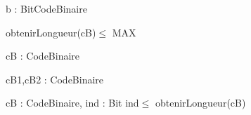 \begin{algorithme}

    {b : Bit}{CodeBinaire}{}

    {
    }
    {obtenirLongueur(cB)$\le$ MAX}

    {cB : CodeBinaire}{\naturelNonNul}{}

    {cB1,cB2 : CodeBinaire}{\booleen}{}

    {cB : CodeBinaire, ind : \naturelNonNul}{Bit}
    {ind$\le$ obtenirLongueur(cB)}

\end{algorithme}
